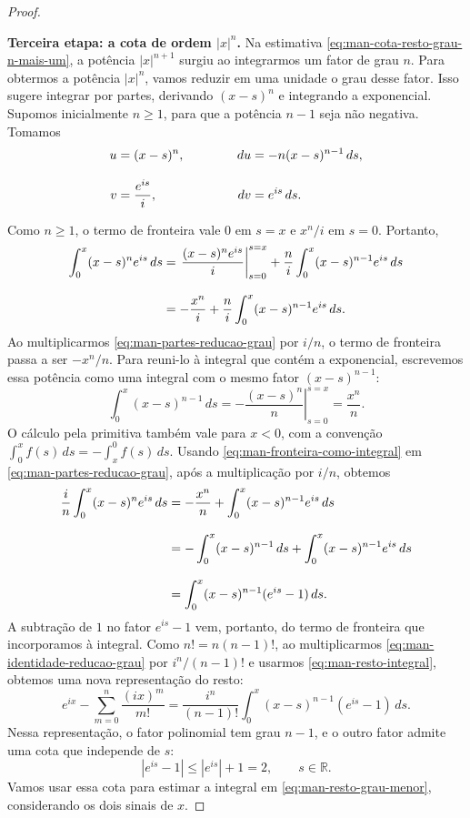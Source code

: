 \documentclass[12pt,portuguese]{article}
\theoremstyle{definition}
\theoremstyle{plainexercise}
\theoremstyle{starredexercise}
\theoremstyle{definition}
\begin{document}
\begin{proof}
\smallskip
\begin{samepage}
\noindent\textbf{Terceira etapa: a cota de ordem $|x|^n$.}
Na estimativa \eqref{eq:man-cota-resto-grau-n-mais-um}, a potência
$|x|^{n+1}$ surgiu ao integrarmos um fator de grau $n$.
Para obtermos a potência $|x|^n$, vamos reduzir em uma unidade
o grau desse fator. Isso sugere integrar por partes, derivando
$(x-s)^n$ e integrando a exponencial. Supomos inicialmente
$n\geqslant1$, para que a potência $n-1$ seja não negativa.
Tomamos
\[
\begin{alignedat}{2}
u &= (x-s)^n,
&\hspace{1.5cm} du &= -n(x-s)^{n-1}\,ds,
\\[0.3cm]
v &= \frac{e^{is}}{i},
& dv &= e^{is}\,ds.
\end{alignedat}
\]
\end{samepage}%
Como $n\geqslant1$, o termo de fronteira vale $0$ em $s=x$
e $x^n/i$ em $s=0$. Portanto,
\begin{align}
\int_0^x(x-s)^n e^{is}\,ds
&=\left.\frac{(x-s)^n e^{is}}{i}\right|_{s=0}^{s=x}
+\frac{n}{i}\int_0^x(x-s)^{n-1}e^{is}\,ds\notag
\\[0.3cm]
&=-\frac{x^n}{i}
+\frac{n}{i}\int_0^x(x-s)^{n-1}e^{is}\,ds.
\label{eq:man-partes-reducao-grau}
\end{align}
Ao multiplicarmos \eqref{eq:man-partes-reducao-grau} por $i/n$,
o termo de fronteira passa a ser $-x^n/n$. Para reuni-lo à integral
que contém a exponencial, escrevemos essa potência como uma integral
com o mesmo fator $(x-s)^{n-1}$:
\begin{equation}\label{eq:man-fronteira-como-integral}
\int_0^x(x-s)^{n-1}\,ds
=\left.-\frac{(x-s)^n}{n}\right|_{s=0}^{s=x}
=\frac{x^n}{n}.
\end{equation}
O cálculo pela primitiva também vale para $x<0$, com a convenção
$\int_0^x f(s)\,ds=-\int_x^0 f(s)\,ds$.
Usando \eqref{eq:man-fronteira-como-integral} em
\eqref{eq:man-partes-reducao-grau}, após a multiplicação por $i/n$,
obtemos
\begin{align}
\frac{i}{n}\int_0^x(x-s)^n e^{is}\,ds
&=-\frac{x^n}{n}+\int_0^x(x-s)^{n-1}e^{is}\,ds\notag
\\[0.3cm]
&=-\int_0^x(x-s)^{n-1}\,ds
+\int_0^x(x-s)^{n-1}e^{is}\,ds\notag
\\[0.3cm]
&=\int_0^x(x-s)^{n-1}(e^{is}-1)\,ds.
\label{eq:man-identidade-reducao-grau}
\end{align}
A subtração de $1$ no fator $e^{is}-1$ vem, portanto, do termo
de fronteira que incorporamos à integral.
Como $n!=n(n-1)!$, ao multiplicarmos
\eqref{eq:man-identidade-reducao-grau} por $i^n/(n-1)!$ e usarmos
\eqref{eq:man-resto-integral}, obtemos uma nova representação do resto:
\begin{equation}\label{eq:man-resto-grau-menor}
e^{ix}-\sum_{m=0}^n\frac{(ix)^m}{m!}
=\frac{i^n}{(n-1)!}
\int_0^x(x-s)^{n-1}(e^{is}-1)\,ds.
\end{equation}
Nessa representação, o fator polinomial tem grau $n-1$, e o outro
fator admite uma cota que independe de $s$:
\[
|e^{is}-1|\leqslant|e^{is}|+1=2,
\qquad s\in\mathbb{R}.
\]
Vamos usar essa cota para estimar a integral em
\eqref{eq:man-resto-grau-menor}, considerando os dois sinais de $x$.


\end{proof}
\end{document}
